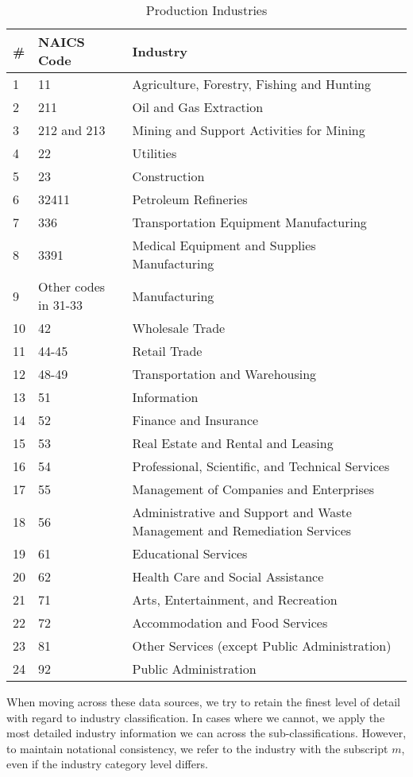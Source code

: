 \documentclass[article,11pt,letterpaper,fleqn]{article}
\theoremstyle{definition}
\numberwithin{equation}{section}
\begin{document}
\begin{table}[htbp]
  \centering
  \caption{Production Industries}
    \begin{tabular}{lll}
    \hline
    \hline
    \# & NAICS Code & Industry \\
    \hline
    1     & 11    & Agriculture, Forestry, Fishing and Hunting \\
    2     & 211   & Oil and Gas Extraction \\
    3     & 212 and 213 & Mining and Support Activities for Mining \\
    4     & 22    & Utilities \\
    5     & 23    & Construction \\
    6     & 32411 & Petroleum Refineries \\
    7     & 336   & Transportation Equipment Manufacturing \\
    8     & 3391  & Medical Equipment and Supplies Manufacturing \\
    9     & Other codes in 31-33 & Manufacturing \\
    10    & 42    & Wholesale Trade \\
    11    & 44-45 & Retail Trade \\
    12    & 48-49 & Transportation and Warehousing \\
    13    & 51    & Information \\
    14    & 52    & Finance and Insurance \\
    15    & 53    & Real Estate and Rental and Leasing \\
    16    & 54    & Professional, Scientific, and Technical Services \\
    17    & 55    & Management of Companies and Enterprises \\
    18    & 56    & Administrative and Support and Waste Management and Remediation Services \\
    19    & 61    & Educational Services \\
    20    & 62    & Health Care and Social Assistance \\
    21    & 71    & Arts, Entertainment, and Recreation \\
    22    & 72    & Accommodation and Food Services \\
    23    & 81    & Other Services (except Public Administration) \\
    24    & 92    & Public Administration \\
      \hline
    \hline
    \end{tabular}%
  \label{tab:prod_ind}%
\end{table}%

When moving across these data sources, we try to retain the finest level of detail with regard to industry classification.  In cases where we cannot, we apply the most detailed industry information we can across the sub-classifications.  However, to maintain notational consistency, we refer to the industry with the subscript $m$, even if the industry category level differs.



\end{document}
